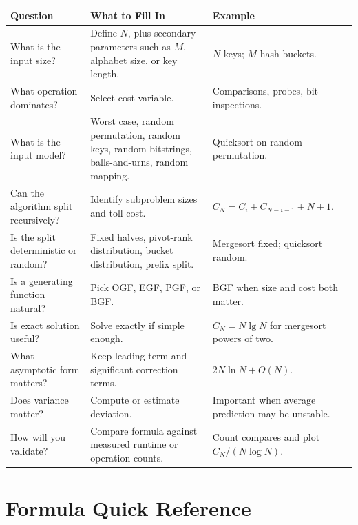 \documentclass[11pt]{article}
\begin{document}
\begin{longtable}{L{0.24\textwidth} L{0.34\textwidth} L{0.32\textwidth}}
\toprule
\textbf{Question} & \textbf{What to Fill In} & \textbf{Example} \\
\midrule
\endhead
What is the input size? & Define \(N\), plus secondary parameters such as \(M\), alphabet size, or key length. & \(N\) keys; \(M\) hash buckets. \\
What operation dominates? & Select cost variable. & Comparisons, probes, bit inspections. \\
What is the input model? & Worst case, random permutation, random keys, random bitstrings, balls-and-urns, random mapping. & Quicksort on random permutation. \\
Can the algorithm split recursively? & Identify subproblem sizes and toll cost. & \(C_N=C_i+C_{N-i-1}+N+1\). \\
Is the split deterministic or random? & Fixed halves, pivot-rank distribution, bucket distribution, prefix split. & Mergesort fixed; quicksort random. \\
Is a generating function natural? & Pick OGF, EGF, PGF, or BGF. & BGF when size and cost both matter. \\
Is exact solution useful? & Solve exactly if simple enough. & \(C_N=N\lg N\) for mergesort powers of two. \\
What asymptotic form matters? & Keep leading term and significant correction terms. & \(2N\ln N + O(N)\). \\
Does variance matter? & Compute or estimate deviation. & Important when average prediction may be unstable. \\
How will you validate? & Compare formula against measured runtime or operation counts. & Count compares and plot \(C_N/(N\log N)\). \\
\bottomrule
\end{longtable}

\section{Formula Quick Reference}
\end{document}
